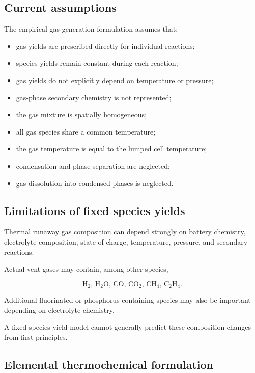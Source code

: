 \subsection{Current assumptions}

The empirical gas-generation formulation assumes that:

\begin{itemize}
    \item gas yields are prescribed directly for individual reactions;
    \item species yields remain constant during each reaction;
    \item gas yields do not explicitly depend on temperature or pressure;
    \item gas-phase secondary chemistry is not represented;
    \item the gas mixture is spatially homogeneous;
    \item all gas species share a common temperature;
    \item the gas temperature is equal to the lumped cell temperature;
    \item condensation and phase separation are neglected;
    \item gas dissolution into condensed phases is neglected.
\end{itemize}


\subsection{Limitations of fixed species yields}

Thermal runaway gas composition can depend strongly on battery chemistry,
electrolyte composition, state of charge, temperature, pressure, and
secondary reactions.

Actual vent gases may contain, among other species,

\begin{equation}
    \mathrm{
        H_2,\,
        H_2O,\,
        CO,\,
        CO_2,\,
        CH_4,\,
        C_2H_4
    }.
\end{equation}

Additional fluorinated or phosphorus-containing species may also be
important depending on electrolyte chemistry.

A fixed species-yield model cannot generally predict these composition
changes from first principles.


\subsection{Elemental thermochemical formulation}

